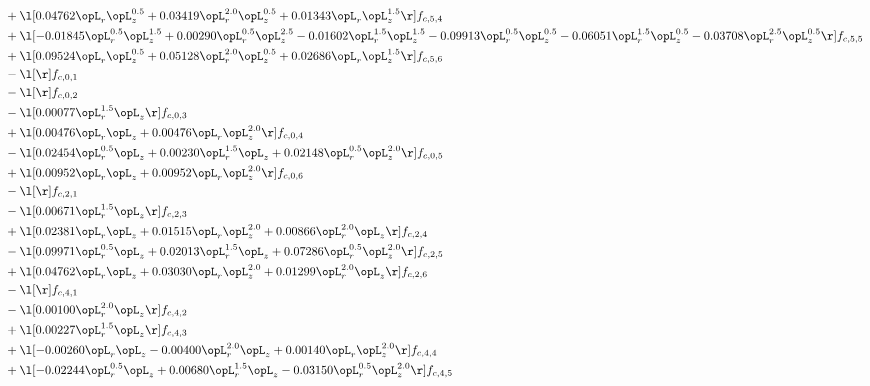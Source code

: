 \begin{alignat}{2}
& + \l[  0.04762 \opL_r \opL_z^{0.5} +  0.03419 \opL_r^{2.0} \opL_z^{0.5} +  0.01343 \opL_r \opL_z^{1.5}  \r] f_{c,5,4} \nonumber \\ 
& + \l[  -0.01845 \opL_r^{0.5} \opL_z^{1.5} +  0.00290 \opL_r^{0.5} \opL_z^{2.5}   -0.01602 \opL_r^{1.5} \opL_z^{1.5}   -0.09913 \opL_r^{0.5} \opL_z^{0.5}   -0.06051 \opL_r^{1.5} \opL_z^{0.5}   -0.03708 \opL_r^{2.5} \opL_z^{0.5}  \r] f_{c,5,5} \nonumber \\ 
& + \l[  0.09524 \opL_r \opL_z^{0.5} +  0.05128 \opL_r^{2.0} \opL_z^{0.5} +  0.02686 \opL_r \opL_z^{1.5}  \r] f_{c,5,6} \nonumber \\ 
& - \l[  \r] f_{c,0,1} \nonumber \\ 
& - \l[  \r] f_{c,0,2} \nonumber \\ 
& - \l[  0.00077 \opL_r^{1.5} \opL_z  \r] f_{c,0,3} \nonumber \\ 
& + \l[  0.00476 \opL_r \opL_z +  0.00476 \opL_r \opL_z^{2.0}  \r] f_{c,0,4} \nonumber \\ 
& - \l[  0.02454 \opL_r^{0.5} \opL_z +  0.00230 \opL_r^{1.5} \opL_z +  0.02148 \opL_r^{0.5} \opL_z^{2.0}  \r] f_{c,0,5} \nonumber \\ 
& + \l[  0.00952 \opL_r \opL_z +  0.00952 \opL_r \opL_z^{2.0}  \r] f_{c,0,6} \nonumber \\ 
& - \l[  \r] f_{c,2,1} \nonumber \\ 
& - \l[  0.00671 \opL_r^{1.5} \opL_z  \r] f_{c,2,3} \nonumber \\ 
& + \l[  0.02381 \opL_r \opL_z +  0.01515 \opL_r \opL_z^{2.0} +  0.00866 \opL_r^{2.0} \opL_z  \r] f_{c,2,4} \nonumber \\ 
& - \l[  0.09971 \opL_r^{0.5} \opL_z +  0.02013 \opL_r^{1.5} \opL_z +  0.07286 \opL_r^{0.5} \opL_z^{2.0}  \r] f_{c,2,5} \nonumber \\ 
& + \l[  0.04762 \opL_r \opL_z +  0.03030 \opL_r \opL_z^{2.0} +  0.01299 \opL_r^{2.0} \opL_z  \r] f_{c,2,6} \nonumber \\ 
& - \l[  \r] f_{c,4,1} \nonumber \\ 
& - \l[  0.00100 \opL_r^{2.0} \opL_z  \r] f_{c,4,2} \nonumber \\ 
& + \l[  0.00227 \opL_r^{1.5} \opL_z  \r] f_{c,4,3} \nonumber \\ 
& + \l[  -0.00260 \opL_r \opL_z   -0.00400 \opL_r^{2.0} \opL_z +  0.00140 \opL_r \opL_z^{2.0}  \r] f_{c,4,4} \nonumber \\ 
& + \l[  -0.02244 \opL_r^{0.5} \opL_z +  0.00680 \opL_r^{1.5} \opL_z   -0.03150 \opL_r^{0.5} \opL_z^{2.0}  \r] f_{c,4,5} \nonumber \\ 

\end{alignat}

